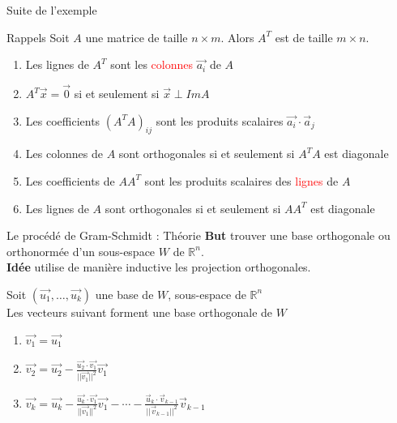 

\begin{parag}{Suite de l'exemple}
    
\end{parag}
\begin{parag}{Rappels}
    Soit $A$ une matrice de taille 
    $n \times m$. Alors $A^T$ est de taille $m \times n$.
    \begin{enumerate}
        \item Les lignes de $A^T$ sont les \textcolor{red}{colonnes} $\vec{a_i}$ de $A$
        \item $A^T\vec{x} = \vec{0}$ si et seulement si $\vec{x} \perp ImA$
        \item Les coefficients $(A^TA)_{ij}$ sont les produits scalaires $\vec{a_i} \cdot \vec{a}_j$
        \item Les colonnes de $A$ sont orthogonales si et seulement si $A^TA$ est diagonale
        \item Les coefficients de $AA^T$ sont les produits scalaires des \textcolor{red}{lignes} de $A$
        \item Les lignes de $A$ sont orthogonales si et seulement si $AA^T$ est diagonale
    \end{enumerate}
\end{parag}

\begin{parag}{Le procédé de Gram-Schmidt : Théorie}
    \textbf{But} trouver une base orthogonale ou orthonormée d'un sous-espace $W$ de $\mathbb{R}^n$.
    \\
    \textbf{Idée} utilise de manière inductive les projection orthogonales.
    \begin{theoreme}
        Soit $(\vec{u_1}, \dots, \vec{u_k})$ une base de $W$, sous-espace de $\mathbb{R}^n$\\
        Les vecteurs suivant forment une base orthogonale de $W$
        \begin{enumerate}
            \item $\vec{v_1} = \vec{u_1}$
            \item $\vec{v_2} = \vec{u_2} - \frac{\vec{u_2}\cdot \vec{v_1}}{||\vec{v_1}||^2}\vec{v_1}$
            \item $\vec{v_k} = \vec{u_k} - \frac{\vec{u_k}\cdot\vec{v_1}}{||\vec{v_1}||^2}\vec{v_1} - \cdots - \frac{\vec{u}_k\cdot\vec{v}_{k-1}}{||\vec{v}_{k-1}||^2}\vec{v}_{k-1}$
        \end{enumerate}
    \end{theoreme}
\end{parag}

